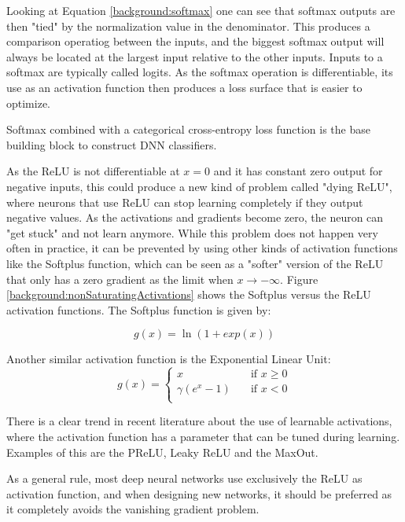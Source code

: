 Looking at Equation \ref{background:softmax} one can see that softmax outputs are then "tied" by the normalization value in the denominator. This produces a comparison operatiog between the inputs, and the biggest softmax output will always be located at the largest input relative to the other inputs. Inputs to a softmax  are typically called logits. As the softmax operation is differentiable, its use as an activation function then produces a loss surface that is easier to optimize.

Softmax combined with a categorical cross-entropy loss function is the base building block to construct DNN classifiers.

As the ReLU is not differentiable at $x = 0$ and it has constant zero output for negative inputs, this could produce a new kind of problem called "dying ReLU", where neurons that use ReLU can stop learning completely if they output negative values. As the activations and gradients become zero, the neuron can "get stuck" and not learn anymore. While this problem does not happen very often in practice, it can be prevented by using other kinds of activation functions like the Softplus function, which can be seen as a "softer" version of the ReLU that only has a zero gradient as the limit when $x \rightarrow -\infty$. Figure \ref{background:nonSaturatingActivations} shows the Softplus versus the ReLU activation functions. The Softplus function is given by:

\begin{equation}
	g(x) = \ln(1 + exp(x))
\end{equation}

Another similar activation function is the Exponential Linear Unit:
\vspace*{-0.1cm}
\begin{equation}
	g(x) = 
	\begin{cases}
		x       			& \quad \text{if } x \geq 0\\
		\gamma (e^x - 1) 	& \quad \text{if } x < 0\\
	\end{cases}
\end{equation}

There is a clear trend in recent literature about the use of learnable activations, where the activation function has a parameter that can be tuned during learning. Examples of this are the PReLU, Leaky ReLU and the MaxOut.

As a general rule, most deep neural networks use exclusively the ReLU as activation function, and when designing new networks, it should be preferred as it completely avoids the vanishing gradient problem.

